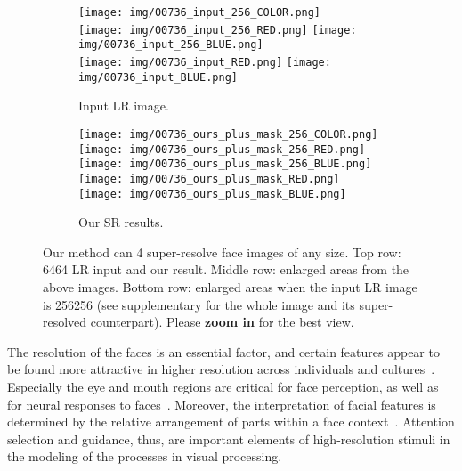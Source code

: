 \documentclass[10pt,twocolumn,letterpaper]{article}
\begin{document}
\begin{figure}[t]
\begin{center}
    \begin{subfigure}[b]{0.235\textwidth}
        \texttt{[image: img/00736\_input\_256\_COLOR.png]}
        \\
        \texttt{[image: img/00736\_input\_256\_RED.png]}
        \texttt{[image: img/00736\_input\_256\_BLUE.png]}
        \\
        \texttt{[image: img/00736\_input\_RED.png]}
        \texttt{[image: img/00736\_input\_BLUE.png]}
        \caption{Input LR image.}
    \end{subfigure}
    \begin{subfigure}[b]{0.235\textwidth}
        \texttt{[image: img/00736\_ours\_plus\_mask\_256\_COLOR.png]}
        \\
        \texttt{[image: img/00736\_ours\_plus\_mask\_256\_RED.png]}
        \texttt{[image: img/00736\_ours\_plus\_mask\_256\_BLUE.png]}
        \\
        \texttt{[image: img/00736\_ours\_plus\_mask\_RED.png]}
        \texttt{[image: img/00736\_ours\_plus\_mask\_BLUE.png]}
        \caption{Our SR results.}
    \end{subfigure}
    \vspace{-6mm}
\end{center}
\caption{Our method can 4 super-resolve face images of any size. 
Top row: 6464 LR input and our result.
Middle row: enlarged areas from the above images.
Bottom row: enlarged areas when the input LR image is 256256
(see supplementary for the whole image and its super-resolved counterpart).
Please \textbf{zoom in} for the best view.}
\label{fig:intro}
\end{figure}
 


The resolution of the faces is an essential factor, and certain features appear to be found more attractive in higher resolution across individuals and cultures~\cite{langois2000,little2011}. Especially the eye and mouth regions are critical for face perception, as well as for neural responses to faces~\cite{smith2009,dehaas2016}. Moreover, the interpretation of facial features is determined by the relative arrangement of parts within a face context~\cite{maurer2002}. Attention selection and guidance, thus, are important elements of high-resolution stimuli in the modeling of the processes in visual processing. 
\end{document}
